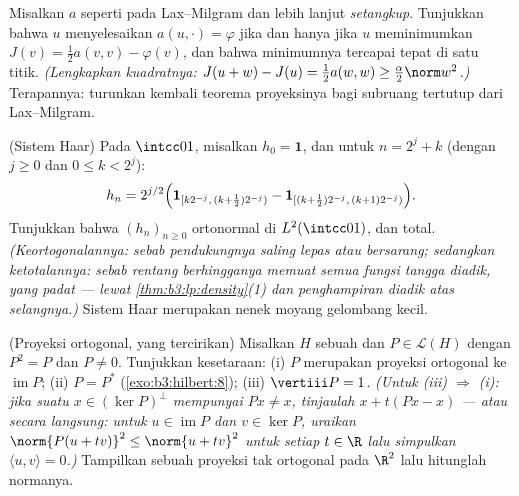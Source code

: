\begin{exercise}[$\star\star$]\label{exo:b3:hilbert:9}
Misalkan $a$ seperti pada Lax--Milgram dan lebih lanjut \emph{setangkup}.
Tunjukkan bahwa $u$ menyelesaikan $a(u, \cdot) = \varphi$ jika dan hanya jika $u$ meminimumkan
$J(v) = \frac12a(v, v) - \varphi(v)$, dan bahwa minimumnya
tercapai tepat di satu titik. \emph{(Lengkapkan kuadratnya:
$J(u + w) - J(u) = \frac12a(w,w) \geq
\frac\alpha2\norm w^2$.)} Terapannya: turunkan kembali
teorema proyeksinya bagi subruang tertutup dari Lax--Milgram.
\end{exercise}

\begin{exercise}[$\star\star\star$]\label{exo:b3:hilbert:10}
(Sistem Haar) Pada $\intcc01$, misalkan $h_{0} = \mathbf 1$, dan
untuk $n = 2^j + k$ (dengan $j \geq 0$ dan $0 \leq k < 2^j$):
\[
h_n = 2^{j/2}\Bigl(\mathbf 1_{[k2^{-j},\,(k +
\frac12)2^{-j})} - \mathbf 1_{[(k+\frac12)2^{-j},\,(k+1)2^{-j})}
\Bigr).
\]
Tunjukkan bahwa $(h_n)_{n\geq0}$ ortonormal di $L^2(\intcc01)$,
dan total. \emph{(Keortogonalannya: sebab pendukungnya saling lepas atau bersarang;
sedangkan ketotalannya: sebab rentang berhingganya memuat semua fungsi tangga diadik,
yang padat --- lewat \cref{thm:b3:lp:density}(1) dan penghampiran
diadik atas selangnya.)} Sistem Haar merupakan nenek moyang
gelombang kecil.
\end{exercise}

\begin{exercise}[$\star\star$]\label{exo:b3:hilbert:11}
(Proyeksi ortogonal, yang tercirikan) Misalkan $H$ sebuah  dan $P \in \mathcal L(H)$ dengan $P^2 = P$ dan $P \neq 0$.
Tunjukkan kesetaraan:
(i) $P$ merupakan proyeksi ortogonal ke
$\operatorname{im}P$;
(ii) $P = P^*$ (\cref{exo:b3:hilbert:8});
(iii) $\vertiii P = 1$.
\emph{(Untuk (iii) $\Rightarrow$ (i): jika suatu $x \in
(\ker P)^\perp$ mempunyai $Px \neq x$, tinjaulah $x + t(Px - x)$
--- atau secara langsung: untuk $u \in \operatorname{im}P$ dan $v \in
\ker P$, uraikan $\norm{P(u + tv)}^2 \leq \norm{u + tv}^2$
untuk setiap $t \in \R$ lalu simpulkan $\langle u, v\rangle = 0$.)}
Tampilkan sebuah proyeksi tak ortogonal pada $\R^2$ lalu hitunglah
normanya.
\end{exercise}

